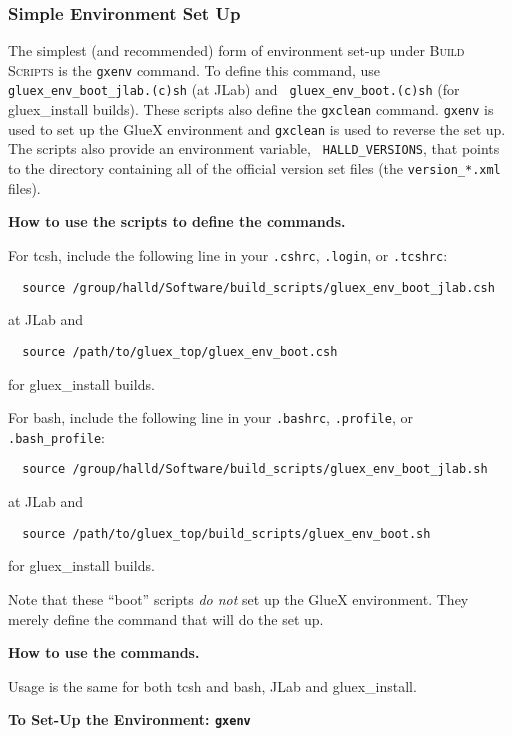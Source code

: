 \documentclass[12pt, letterpaper]{article}
\newcommand{\bs}{\textsc{Build Scripts}}
\newcommand{\gxenv}{{\tt gxenv}}
\begin{document}
\subsubsection{Simple Environment Set Up}

The simplest (and recommended) form of environment set-up under \bs{}
is the \gxenv{} command. To define this command, use {\tt
  gluex\_env\_boot\_jlab.(c)sh} (at JLab) and {\tt
  gluex\_env\_boot.(c)sh} (for gluex\_install builds). These scripts
also define the {\tt gxclean} command. {\tt gxenv} is used to set up
the GlueX environment and {\tt gxclean} is used to reverse the set
up. The scripts also provide an environment variable, {\tt
  HALLD\_VERSIONS}, that points to the directory containing all of the
official version set files (the {\tt version\_*.xml} files).

\begin{description}
\item{\bf How to use the scripts to define the commands.}

For tcsh, include the following line in your {\tt .cshrc}, {\tt .login}, or {\tt .tcshrc}:
\begin{verbatim}
  source /group/halld/Software/build_scripts/gluex_env_boot_jlab.csh
\end{verbatim}
at JLab and
\begin{verbatim}
  source /path/to/gluex_top/gluex_env_boot.csh
\end{verbatim}
for gluex\_install builds.

For bash, include the following line in your {\tt .bashrc}, {\tt .profile}, or {\tt .bash\_profile}:
\begin{verbatim}
  source /group/halld/Software/build_scripts/gluex_env_boot_jlab.sh
\end{verbatim}
at JLab and
\begin{verbatim}
  source /path/to/gluex_top/build_scripts/gluex_env_boot.sh
\end{verbatim}
for gluex\_install builds.

Note that these ``boot'' scripts {\it do not} set up the GlueX environment. They merely define the command that will do the set up.

\item{\bf How to use the commands.}

Usage is the same for both tcsh and bash, JLab and gluex\_install.

\begin{description}
\item{\bf To Set-Up the Environment: {\tt gxenv}}


\end{description}
\end{description}
\end{document}
